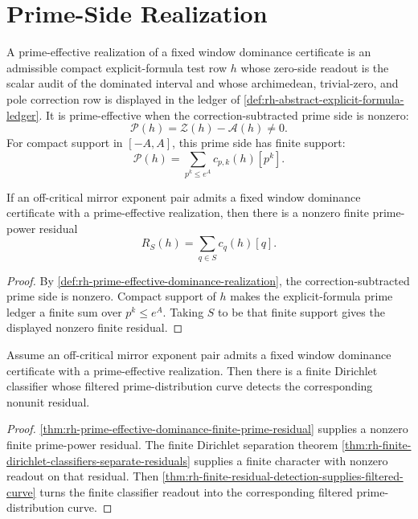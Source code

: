 \section{Prime-Side Realization}
\label{sec:rh-fixed-window-prime-side-realization}

\begin{definition}
\label{def:rh-prime-effective-dominance-realization}
A prime-effective realization of a fixed window dominance certificate
is an admissible compact explicit-formula test row $h$ whose zero-side
readout is the scalar audit of the dominated interval and whose
archimedean, trivial-zero, and pole correction row is displayed in the
ledger of \autoref{def:rh-abstract-explicit-formula-ledger}.  It is
prime-effective when the correction-subtracted prime side is nonzero:
$$
\mathcal P(h)=\mathcal Z(h)-\mathcal A(h)\ne0.
$$
For compact support in $[-A,A]$, this prime side has finite support:
$$
\mathcal P(h)
=
\sum_{p^k\le e^A}c_{p,k}(h)[p^k].
$$
\end{definition}

\begin{theorem}
\label{thm:rh-prime-effective-dominance-finite-prime-residual}
If an off-critical mirror exponent pair admits a fixed window dominance
certificate with a prime-effective realization, then there is a
nonzero finite prime-power residual
$$
R_S(h)=\sum_{q\in S}c_q(h)[q].
$$
\end{theorem}

\begin{proof}
By \autoref{def:rh-prime-effective-dominance-realization},
the correction-subtracted prime side is nonzero.  Compact support of
$h$ makes the explicit-formula prime ledger a finite sum over
$p^k\le e^A$.  Taking $S$ to be that finite support gives the displayed
nonzero finite residual.
\end{proof}

\begin{theorem}
\label{thm:rh-fixed-window-dominance-supplies-filtered-prime-detection}
Assume an off-critical mirror exponent pair admits a fixed window
dominance certificate with a prime-effective realization.  Then there
is a finite Dirichlet classifier whose filtered prime-distribution
curve detects the corresponding nonunit residual.
\end{theorem}

\begin{proof}
\autoref{thm:rh-prime-effective-dominance-finite-prime-residual}
supplies a nonzero finite prime-power residual.  The finite Dirichlet
separation theorem
\autoref{thm:rh-finite-dirichlet-classifiers-separate-residuals}
supplies a finite character with nonzero readout on that residual.
Then
\autoref{thm:rh-finite-residual-detection-supplies-filtered-curve}
turns the finite classifier readout into the corresponding filtered
prime-distribution curve.
\end{proof}

